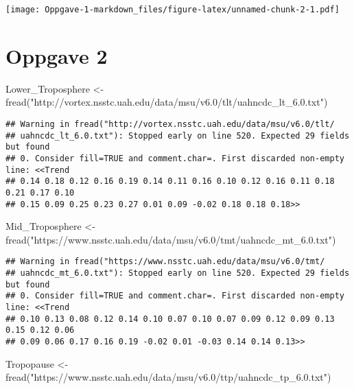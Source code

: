 \documentclass[
]{article}
\newenvironment{Shaded}{\begin{snugshade}}{\end{snugshade}}
\newcommand{\FunctionTok}[1]{\textcolor[rgb]{0.00,0.00,0.00}{#1}}
\newcommand{\NormalTok}[1]{#1}
\newcommand{\OtherTok}[1]{\textcolor[rgb]{0.56,0.35,0.01}{#1}}
\newcommand{\StringTok}[1]{\textcolor[rgb]{0.31,0.60,0.02}{#1}}
\begin{document}
\texttt{[image: Oppgave-1-markdown\_files/figure-latex/unnamed-chunk-2-1.pdf]}

\hypertarget{oppgave-2}{%
\section{Oppgave 2}\label{oppgave-2}}

\begin{Shaded}
\begin{Highlighting}[]
\NormalTok{Lower\_Troposphere }\OtherTok{\textless{}{-}} \FunctionTok{fread}\NormalTok{(}\StringTok{"http://vortex.nsstc.uah.edu/data/msu/v6.0/tlt/uahncdc\_lt\_6.0.txt"}\NormalTok{)}
\end{Highlighting}
\end{Shaded}

\begin{verbatim}
## Warning in fread("http://vortex.nsstc.uah.edu/data/msu/v6.0/tlt/
## uahncdc_lt_6.0.txt"): Stopped early on line 520. Expected 29 fields but found
## 0. Consider fill=TRUE and comment.char=. First discarded non-empty line: <<Trend
## 0.14 0.18 0.12 0.16 0.19 0.14 0.11 0.16 0.10 0.12 0.16 0.11 0.18 0.21 0.17 0.10
## 0.15 0.09 0.25 0.23 0.27 0.01 0.09 -0.02 0.18 0.18 0.18>>
\end{verbatim}

\begin{Shaded}
\begin{Highlighting}[]
\NormalTok{Mid\_Troposphere }\OtherTok{\textless{}{-}} \FunctionTok{fread}\NormalTok{(}\StringTok{"https://www.nsstc.uah.edu/data/msu/v6.0/tmt/uahncdc\_mt\_6.0.txt"}\NormalTok{)}
\end{Highlighting}
\end{Shaded}

\begin{verbatim}
## Warning in fread("https://www.nsstc.uah.edu/data/msu/v6.0/tmt/
## uahncdc_mt_6.0.txt"): Stopped early on line 520. Expected 29 fields but found
## 0. Consider fill=TRUE and comment.char=. First discarded non-empty line: <<Trend
## 0.10 0.13 0.08 0.12 0.14 0.10 0.07 0.10 0.07 0.09 0.12 0.09 0.13 0.15 0.12 0.06
## 0.09 0.06 0.17 0.16 0.19 -0.02 0.01 -0.03 0.14 0.14 0.13>>
\end{verbatim}

\begin{Shaded}
\begin{Highlighting}[]
\NormalTok{Tropopause }\OtherTok{\textless{}{-}} \FunctionTok{fread}\NormalTok{(}\StringTok{"https://www.nsstc.uah.edu/data/msu/v6.0/ttp/uahncdc\_tp\_6.0.txt"}\NormalTok{)}
\end{Highlighting}
\end{Shaded}
\end{document}
